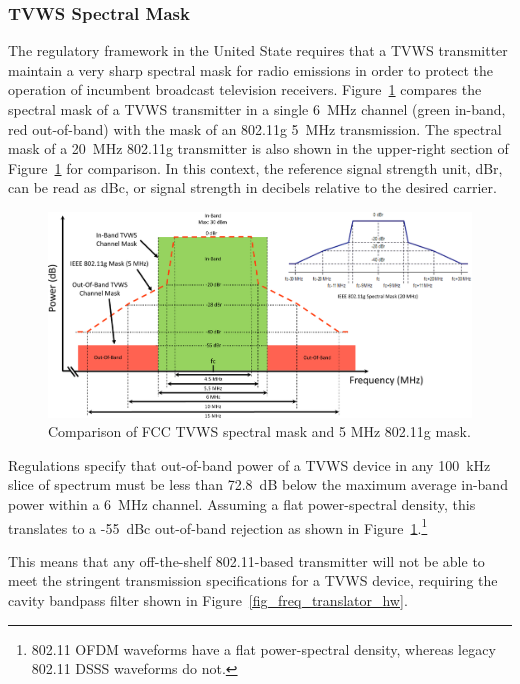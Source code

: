 \subsubsection{TVWS Spectral Mask}

	The regulatory framework in the United State requires that a \ac{TVWS} transmitter maintain a very sharp spectral mask for radio emissions in order to protect the operation of incumbent broadcast television receivers.
	Figure~\ref{fig_spectral_mask} compares the spectral mask of a \ac{TVWS} transmitter in a single 6~MHz channel (green in-band, red out-of-band) with the mask of an 802.11g 5~MHz transmission.
	The spectral mask of a 20~MHz 802.11g transmitter is also shown in the upper-right section of Figure~\ref{fig_spectral_mask} for comparison.
	In this context, the reference signal strength unit, dBr, can be read as dBc, or signal strength in decibels relative to the desired carrier.

\begin{figure}[h!]
\centering
  	\includegraphics[width=1\linewidth]{figs/wardrive/fcc_spectral_mask}   
   	\caption{Comparison of FCC TVWS spectral mask and 5 MHz 802.11g mask.
	\label{fig_spectral_mask}}
\end{figure}

	Regulations specify that out-of-band power of a \ac{TVWS} device in any 100~kHz slice of spectrum must be less than 72.8~dB below the maximum average in-band power within a 6~MHz channel.
	Assuming a flat power-spectral density, this translates to a -55~dBc out-of-band rejection as shown in Figure~\ref{fig_spectral_mask}.\footnote{802.11 \ac{OFDM} waveforms have a flat power-spectral density, whereas legacy 802.11 \ac{DSSS} waveforms do not.}
	
	This means that any off-the-shelf 802.11-based transmitter will not be able to meet the stringent transmission specifications for a \ac{TVWS} device, requiring the cavity bandpass filter shown in Figure~\ref{fig_freq_translator_hw}.
	
